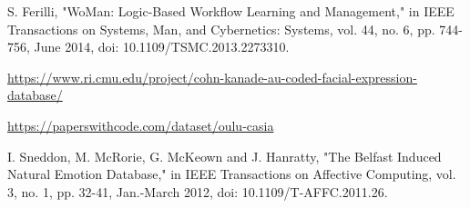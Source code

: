 \begin{thebibliography}{9}
    S. Ferilli, "WoMan: Logic-Based Workflow Learning and Management," in IEEE Transactions on Systems, Man, and Cybernetics: Systems, vol. 44, no. 6, pp. 744-756, June 2014, doi: 10.1109/TSMC.2013.2273310.

     \url{https://www.ri.cmu.edu/project/cohn-kanade-au-coded-facial-expression-database/}

     \url{https://paperswithcode.com/dataset/oulu-casia}

    I. Sneddon, M. McRorie, G. McKeown and J. Hanratty, "The Belfast Induced Natural Emotion Database," in IEEE Transactions on Affective Computing, vol. 3, no. 1, pp. 32-41, Jan.-March 2012, doi: 10.1109/T-AFFC.2011.26.
    
\end{thebibliography}
